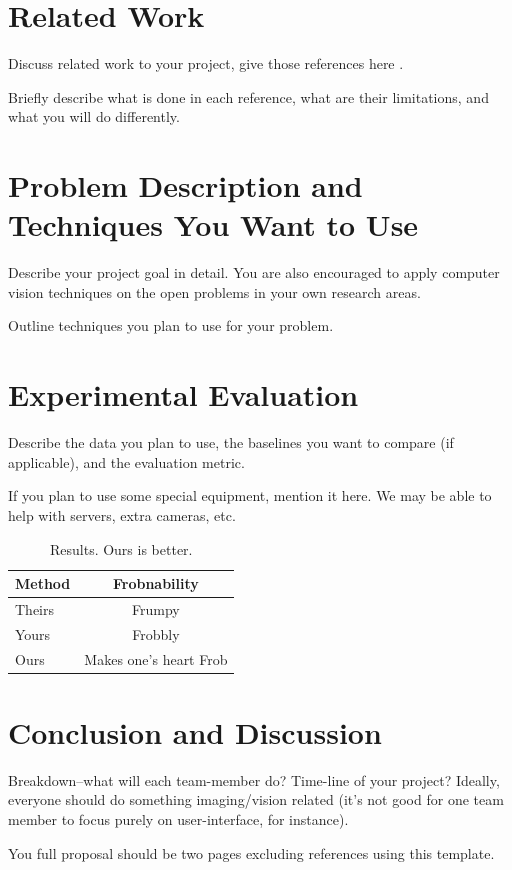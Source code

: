 \documentclass[10pt,letterpaper]{article}
\begin{document}
 
 \section{Related Work}

Discuss related work to your project, give those references here \cite{Alpher03,Alpher04,Authors06}. 

Briefly describe what is done in each reference, what are their limitations, and what you will do differently.
 
 
 
 
\section{Problem Description and Techniques You Want to Use}

Describe your project goal in detail. You are also encouraged to apply computer vision techniques on the open problems
in your own research areas.

Outline techniques you plan to use for your problem.

\section{Experimental Evaluation}
 

Describe the data you plan to use, the baselines you want to compare (if applicable), and the evaluation metric.

If you plan to use some special equipment, mention it here.   We may be able to help with servers, extra cameras, etc.

\begin{table}
\begin{center}
\begin{tabular}{|l|c|}
\hline
Method & Frobnability \\
\hline\hline
Theirs & Frumpy \\
Yours & Frobbly \\
Ours & Makes one's heart Frob\\
\hline
\end{tabular}
\end{center}
\caption{Results.   Ours is better.}
\end{table}

 
\section{Conclusion and Discussion}
 
Breakdown--what will each team-member do? Time-line of your project? Ideally, everyone should do something imaging/vision related (it's not good for one team member to focus purely on user-interface, for instance).

You full proposal should be two pages excluding references using this template.

\clearpage

{\small


}
\end{document}
